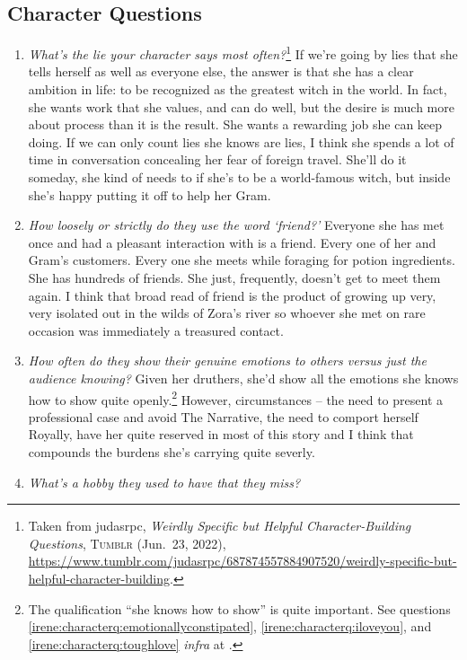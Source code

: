   \subsection{Character Questions}
  \begin{enumerate}
    \item \textit{What’s the lie your character says most often?}\footnote{Taken from judasrpc, \textit{Weirdly Specific but Helpful Character-Building Questions}, \textsc{Tumblr} (Jun.~23, 2022), \url{https://www.tumblr.com/judasrpc/687874557884907520/weirdly-specific-but-helpful-character-building}.}\label{irene:characterqs:lies}
      If we're going by lies that she tells herself as well as everyone else, the answer is that she has a clear ambition in life: to be recognized as the greatest witch in the world. In fact, she wants work that she values, and can do well, but the desire is much more about process than it is the result. She wants a rewarding job she can keep doing. If we can only count lies she knows are lies, I think she spends a lot of time in conversation concealing her fear of foreign travel. She'll do it someday, she kind of needs to if she's to be a world-famous witch, but inside she's happy putting it off to help her Gram.  
    \item \textit{How loosely or strictly do they use the word ‘friend?’}
      Everyone she has met once and had a pleasant interaction with is a friend. Every one of her and Gram's customers. Every one she meets while foraging for potion ingredients. She has hundreds of friends. She just, frequently, doesn't get to meet them again. I think that broad read of friend is the product of growing up very, very isolated out in the wilds of Zora's river so whoever she met on rare occasion was immediately a treasured contact. 
    \item \textit{How often do they show their genuine emotions to others versus just the audience knowing?}
      Given her druthers, she'd show all the emotions she knows how to show quite openly.\footnote{The qualification ``she knows how to show'' is quite important. See questions \ref{irene:characterq:emotionallyconstipated}, \ref{irene:characterq:iloveyou}, and \ref{irene:characterq:toughlove} \textit{infra} at \pageref{irene:characterq:emotionallyconstipated}.} However, circumstances -- the need to present a professional case and avoid The Narrative, the need to comport herself Royally, have her quite reserved in most of this story and I think that compounds the burdens she's carrying quite severly.
    \item \textit{What’s a hobby they used to have that they miss?}

\end{enumerate}
